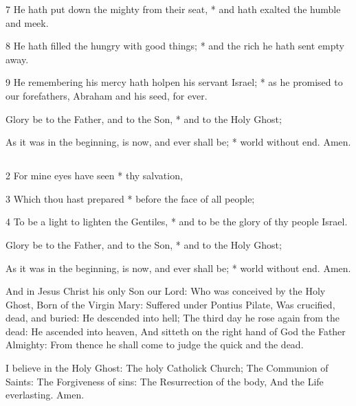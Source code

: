 7 He hath put down the mighty from their seat, * and hath exalted the humble and meek.

8 He hath filled the hungry with good things; * and the rich he hath sent empty away.

9 He remembering his mercy hath holpen his servant Israel; * as he promised to our forefathers, Abraham and his seed, for ever.

Glory be to the Father, and to the Son, * and to the Holy Ghost;

As it was in the beginning, is now, and ever shall be; * world without end. Amen.

\medskip

\subsection{}


2 For mine eyes have seen * thy salvation,

3 Which thou hast prepared * before the face of all people;

4 To be a light to lighten the Gentiles, * and to be the glory of thy people Israel.

Glory be to the Father, and to the Son, * and to the Holy Ghost;

As it was in the beginning, is now, and ever shall be; * world without end. Amen.

\medskip


And in Jesus Christ his only Son our Lord: Who was conceived by the Holy Ghost, Born of the Virgin Mary: Suffered under Pontius Pilate, Was crucified, dead, and buried: He descended into hell; The third day he rose again from the dead: He ascended into heaven, And sitteth on the right hand of God the Father Almighty: From thence he shall come to judge the quick and the dead.

I believe in the Holy Ghost: The holy Catholick Church; The Communion of Saints: The Forgiveness of sins: The Resurrection of the body, And the Life everlasting. Amen.

